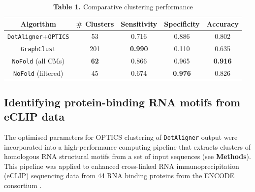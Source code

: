 \documentclass[a4paper,11pt]{article}
\newcommand\dotaligner{\texttt{DotAligner}}
\begin{document}
\begin{table}
\centering
\caption{\textbf{Table 1.}  Comparative clustering performance }
\begin{tabular}{ccccc}
\hline
Algorithm & \# Clusters & Sensitivity & Specificity & Accuracy \\
\hline
\dotaligner{}+\texttt{OPTICS} & 53 & 0.716 & 0.886& 0.802\\
\texttt{GraphClust} & 201 & \textbf{0.990} & 0.110 & 0.635\\ %
\texttt{NoFold} (all CMs) & \textbf{62} & 0.866 & 0.965 & \textbf{0.916 }\\ %
\texttt{NoFold} (filtered) & 45 & 0.674 & \textbf{0.976} & 0.826\\ %
\hline
\end{tabular}
\end{table}


\subsection*{ Identifying protein-binding RNA motifs from eCLIP data }
The optimised parameters for OPTICS clustering of \dotaligner{} output were incorporated into 
a high-performance computing pipeline that extracts clusters of homologous RNA structural motifs from a set of input sequences (see \textbf{Methods}).  This pipeline was applied to enhanced cross-linked 
RNA immunoprecipitation (eCLIP) sequencing data from 44 RNA binding proteins from the ENCODE consortium  \cite{van2016robust}. 
\end{document}
